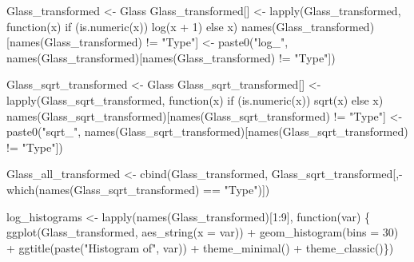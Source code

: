 \documentclass[
  letterpaper,
  DIV=11,
  numbers=noendperiod]{scrartcl}
\newenvironment{Shaded}{\begin{snugshade}}{\end{snugshade}}
\newcommand{\AttributeTok}[1]{\textcolor[rgb]{0.40,0.45,0.13}{#1}}
\newcommand{\ControlFlowTok}[1]{\textcolor[rgb]{0.00,0.23,0.31}{#1}}
\newcommand{\DecValTok}[1]{\textcolor[rgb]{0.68,0.00,0.00}{#1}}
\newcommand{\FunctionTok}[1]{\textcolor[rgb]{0.28,0.35,0.67}{#1}}
\newcommand{\NormalTok}[1]{\textcolor[rgb]{0.00,0.23,0.31}{#1}}
\newcommand{\OtherTok}[1]{\textcolor[rgb]{0.00,0.23,0.31}{#1}}
\newcommand{\SpecialCharTok}[1]{\textcolor[rgb]{0.37,0.37,0.37}{#1}}
\newcommand{\StringTok}[1]{\textcolor[rgb]{0.13,0.47,0.30}{#1}}
\begin{document}
\begin{Shaded}
\begin{Highlighting}[]
\NormalTok{Glass\_transformed }\OtherTok{\textless{}{-}}\NormalTok{ Glass}
\NormalTok{Glass\_transformed[] }\OtherTok{\textless{}{-}} \FunctionTok{lapply}\NormalTok{(Glass\_transformed, }\ControlFlowTok{function}\NormalTok{(x) }\ControlFlowTok{if}\NormalTok{ (}\FunctionTok{is.numeric}\NormalTok{(x)) }\FunctionTok{log}\NormalTok{(x }\SpecialCharTok{+} \DecValTok{1}\NormalTok{) }\ControlFlowTok{else}\NormalTok{ x)}
\FunctionTok{names}\NormalTok{(Glass\_transformed)[}\FunctionTok{names}\NormalTok{(Glass\_transformed) }\SpecialCharTok{!=} \StringTok{"Type"}\NormalTok{] }\OtherTok{\textless{}{-}} \FunctionTok{paste0}\NormalTok{(}\StringTok{"log\_"}\NormalTok{, }\FunctionTok{names}\NormalTok{(Glass\_transformed)[}\FunctionTok{names}\NormalTok{(Glass\_transformed) }\SpecialCharTok{!=} \StringTok{"Type"}\NormalTok{])}

\NormalTok{Glass\_sqrt\_transformed }\OtherTok{\textless{}{-}}\NormalTok{ Glass}
\NormalTok{Glass\_sqrt\_transformed[] }\OtherTok{\textless{}{-}} \FunctionTok{lapply}\NormalTok{(Glass\_sqrt\_transformed, }\ControlFlowTok{function}\NormalTok{(x) }\ControlFlowTok{if}\NormalTok{ (}\FunctionTok{is.numeric}\NormalTok{(x)) }\FunctionTok{sqrt}\NormalTok{(x) }\ControlFlowTok{else}\NormalTok{ x)}
\FunctionTok{names}\NormalTok{(Glass\_sqrt\_transformed)[}\FunctionTok{names}\NormalTok{(Glass\_sqrt\_transformed) }\SpecialCharTok{!=} \StringTok{"Type"}\NormalTok{] }\OtherTok{\textless{}{-}} \FunctionTok{paste0}\NormalTok{(}\StringTok{"sqrt\_"}\NormalTok{, }\FunctionTok{names}\NormalTok{(Glass\_sqrt\_transformed)[}\FunctionTok{names}\NormalTok{(Glass\_sqrt\_transformed) }\SpecialCharTok{!=} \StringTok{"Type"}\NormalTok{])}

\NormalTok{Glass\_all\_transformed }\OtherTok{\textless{}{-}} \FunctionTok{cbind}\NormalTok{(Glass\_transformed, Glass\_sqrt\_transformed[,}\SpecialCharTok{{-}}\FunctionTok{which}\NormalTok{(}\FunctionTok{names}\NormalTok{(Glass\_sqrt\_transformed) }\SpecialCharTok{==} \StringTok{"Type"}\NormalTok{)])}

\NormalTok{log\_histograms }\OtherTok{\textless{}{-}} \FunctionTok{lapply}\NormalTok{(}\FunctionTok{names}\NormalTok{(Glass\_transformed)[}\DecValTok{1}\SpecialCharTok{:}\DecValTok{9}\NormalTok{], }\ControlFlowTok{function}\NormalTok{(var) \{}
  \FunctionTok{ggplot}\NormalTok{(Glass\_transformed, }\FunctionTok{aes\_string}\NormalTok{(}\AttributeTok{x =}\NormalTok{ var)) }\SpecialCharTok{+} 
    \FunctionTok{geom\_histogram}\NormalTok{(}\AttributeTok{bins =} \DecValTok{30}\NormalTok{) }\SpecialCharTok{+} 
    \FunctionTok{ggtitle}\NormalTok{(}\FunctionTok{paste}\NormalTok{(}\StringTok{"Histogram of"}\NormalTok{, var)) }\SpecialCharTok{+} 
    \FunctionTok{theme\_minimal}\NormalTok{() }\SpecialCharTok{+}
    \FunctionTok{theme\_classic}\NormalTok{()\})}


\end{Highlighting}
\end{Shaded}
\end{document}
